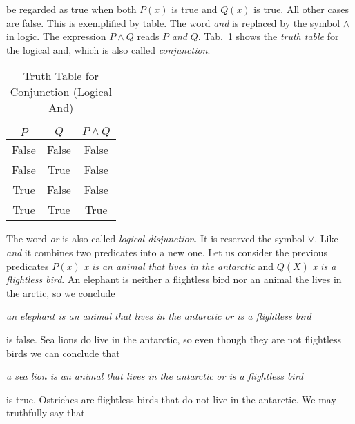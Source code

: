             be regarded as true when both $P(x)$ is true and $Q(x)$ is true.
            All other cases are false. This is exemplified by table. The word
            \textit{and} is replaced by the symbol $\land$ in logic. The
            expression $P\land{Q}$ reads $P$ \textit{and} $Q$.
            Tab.~\ref{tab:truth_table_conjunction} shows the
            \textit{truth table} for the logical and, which is also called
            \textit{conjunction}.
            \begin{table}[H]
                \centering
                \begin{tabular}{c | c | c}
                    $P$&$Q$&$P\land{Q}$\\
                    \hline
                    False&False&False\\
                    \hline
                    False&True&False\\
                    \hline
                    True&False&False\\
                    \hline
                    True&True&True
                \end{tabular}
                \caption{Truth Table for Conjunction (Logical And)}
                \label{tab:truth_table_conjunction}
            \end{table}
            The word \textit{or} is also called
            \textit{logical disjunction}. It is reserved the symbol $\lor$. Like
            \textit{and} it combines two predicates into a new one. Let us
            consider the previous predicates
            $P(x)$ \textit{x is an animal that lives in the antarctic} and
            $Q(X)$ \textit{x is a flightless bird}. An elephant is neither a
            flightless bird nor an animal the lives in the arctic, so we
            conclude
            \begin{center}
                \textit{an elephant is an animal that lives in the antarctic}
                \textit{or is a flightless bird}
            \end{center}
            is false. Sea lions do live in the antarctic, so even though they
            are not flightless birds we can conclude that
            \begin{center}
                \textit{a sea lion is an animal that lives in the antarctic}
                \textit{or is a flightless bird}
            \end{center}
            is true. Ostriches are flightless birds that do not live in the
            antarctic. We may truthfully say that
